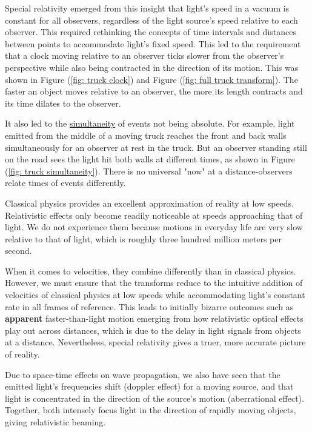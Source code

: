 Special relativity emerged from this insight that light's speed in a vacuum is constant for all observers, regardless of the light source's speed relative to each observer.
This required rethinking the concepts of time intervals and distances between points to accommodate light's fixed speed.
This led to the requirement that a clock moving relative to an observer ticks slower from the observer's perspective while also being contracted in the direction of its motion.
This was shown in Figure (\ref{fig: truck clock}) and Figure (\ref{fig: full truck transform}).
The faster an object moves relative to an observer, the more its length contracts and its time dilates to the observer.

It also led to the \hyperlink{def-simultaneity}{simultaneity} of events not being absolute.
For example, light emitted from the middle of a moving truck reaches the front and back walls simultaneously for an observer at rest in the truck.
But an observer standing still on the road sees the light hit both walls at different times, as shown in Figure (\ref{fig: truck simultaneity}).
There is no universal "now" at a distance-observers relate times of events differently.

Classical physics provides an excellent approximation of reality at low speeds.
Relativistic effects only become readily noticeable at speeds approaching that of light.
We do not experience them because motions in everyday life are very slow relative to that of light, which is roughly three hundred million meters per second.

When it comes to velocities, they combine differently than in classical physics.
However, we must ensure that the transforms reduce to the intuitive addition of velocities of classical physics at low speeds while accommodating light's constant rate in all frames of reference.
This leads to initially bizarre outcomes such as \textbf{apparent} faster-than-light motion emerging from how relativistic optical effects play out across distances, which is due to the delay in light signals from objects at a distance.
Nevertheless, special relativity gives a truer, more accurate picture of reality.

Due to space-time effects on wave propagation, we also have seen that the emitted light's frequencies shift (doppler effect) for a moving source, and that light is concentrated in the direction of the source's motion (aberrational effect).
Together, both intensely focus light in the direction of rapidly moving objects, giving relativistic beaming.

